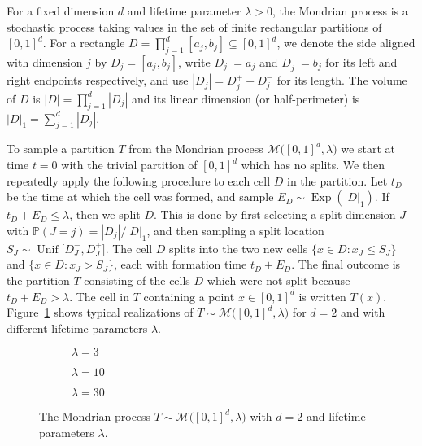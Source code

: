 \documentclass[11pt,lof]{puthesis}
\renewcommand{\P}{\ensuremath{\mathbb{P}}}
\newcommand{\cM}{\ensuremath{\mathcal{M}}}
\DeclareMathOperator{\Unif}{Unif}
\DeclareMathOperator{\Exp}{Exp}
\theoremstyle{break}
\theoremstyle{proof}
\begin{document}
For a fixed dimension $d$ and lifetime parameter $\lambda > 0$, the Mondrian
process is a stochastic process taking values in the set of finite rectangular
partitions of $[0,1]^d$. For a rectangle
$D = \prod_{j=1}^d [a_j, b_j] \subseteq [0,1]^d$,
we denote the side aligned with dimension $j$ by $D_j = [a_j, b_j]$, write
$D_j^- = a_j$ and $D_j^+ = b_j$ for its left and right endpoints respectively,
and use $|D_j| = D_j^+ - D_j^-$ for its length. The volume of $D$ is
$|D| = \prod_{j=1}^{d} |D_j|$ and its linear dimension (or half-perimeter) is
$|D|_1 = \sum_{j=1}^{d} |D_j|$.

To sample a partition $T$ from the Mondrian process
$\cM \big( [0,1]^d, \lambda \big)$ we start at time $t=0$ with the trivial
partition of $[0,1]^d$ which has no splits. We then repeatedly apply the
following procedure to each cell $D$ in the partition. Let $t_D$ be the time at
which the cell was formed, and sample $E_D \sim \Exp \left( |D|_1 \right)$. If
$t_D + E_D \leq \lambda$, then we split $D$. This is done by first selecting a
split dimension $J$ with $\P(J=j) = |D_j| / |D|_1$, and then sampling a split
location $S_J \sim \Unif\big[D_J^-, D_J^+\big]$. The cell $D$ splits into the
two new cells $\{x \in D : x_J \leq S_J\}$ and $\{x \in D : x_J > S_J\}$, each
with formation time $t_D + E_D$. The final outcome is the partition $T$
consisting of the cells $D$ which were not split because $t_D + E_D > \lambda$.
The cell in $T$ containing a point $x \in [0,1]^d$ is written $T(x)$.
Figure~\ref{fig:mondrian_process} shows typical realizations of
$T \sim \cM\big( [0,1]^d, \lambda \big)$ for $d=2$ and with different lifetime
parameters $\lambda$.
%
\begin{figure}[t]
\centering
%
\begin{subfigure}{0.32\textwidth}
\centering
\caption{$\lambda = 3$}
\end{subfigure}
%
\begin{subfigure}{0.32\textwidth}
\centering
\caption{$\lambda = 10$}
\end{subfigure}
%
\begin{subfigure}{0.32\textwidth}
\centering
\caption{$\lambda = 30$}
\end{subfigure}
%
\caption[The Mondrian process]{
The Mondrian process $T \sim \cM \big( [0,1]^d, \lambda \big)$ with
$d=2$ and lifetime parameters $\lambda$.}
\label{fig:mondrian_process}
\end{figure}
\end{document}

